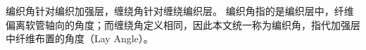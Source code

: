 编织角针对编织加强层，缠绕角针对缠绕编织层。
编织角指的是编织层中，纤维偏离软管轴向的角度；而缠绕角定义相同，因此本文统一称为编织角，指代加强层中纤维布置的角度（Lay Angle）。

\begin{figure}[!htb]
\centering
{}
\end{figure}
